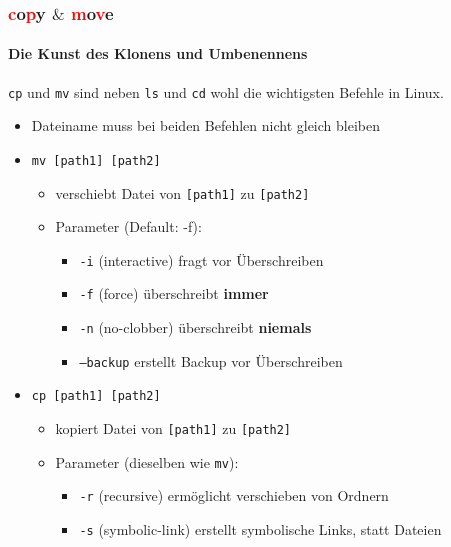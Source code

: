 \documentclass[12pt,utf8, handout]{beamer}
\begin{document}
\begin{frame}
\frametitle{\textcolor{red}{c}o\textcolor{red}{p}y $\&$ \textcolor{red}{m}o\textcolor{red}{v}e}
\framesubtitle{\textcolor{ownDarkOr}{Die Kunst des Klonens und Umbenennens}}
\texttt{cp} und \texttt{mv} sind neben \texttt{ls} und \texttt{cd} wohl die wichtigsten Befehle in Linux.
\begin{itemize}
	\item Dateiname muss bei beiden Befehlen nicht gleich bleiben
	\item \texttt{mv [path1] [path2]}
	\begin{itemize}
		\item verschiebt Datei von \texttt{[path1]} zu \texttt{[path2]}
		\item Parameter (Default: -f):
		\begin{itemize}[<+->]
			\item {\scriptsize \texttt{-i} (interactive) fragt vor Überschreiben}
			\item {\scriptsize \texttt{-f} (force) überschreibt \textbf{immer}}
			\item {\scriptsize \texttt{-n} (no-clobber) überschreibt \textbf{niemals}}
			\item {\scriptsize \texttt{--backup} erstellt Backup vor Überschreiben}
		\end{itemize}
	\end{itemize}
	\item \texttt{cp [path1] [path2]}
	\begin{itemize}
		\item kopiert Datei von \texttt{[path1]} zu \texttt{[path2]}
		\item Parameter {\scriptsize (dieselben wie \texttt{mv})}:
		\begin{itemize}[<+->]
			\item {\scriptsize \texttt{-r} (recursive) ermöglicht verschieben von Ordnern}
			\item {\scriptsize \texttt{-s} (symbolic-link) erstellt symbolische Links, statt Dateien}
		\end{itemize}
	\end{itemize}
\end{itemize}
\end{frame}
\end{document}
